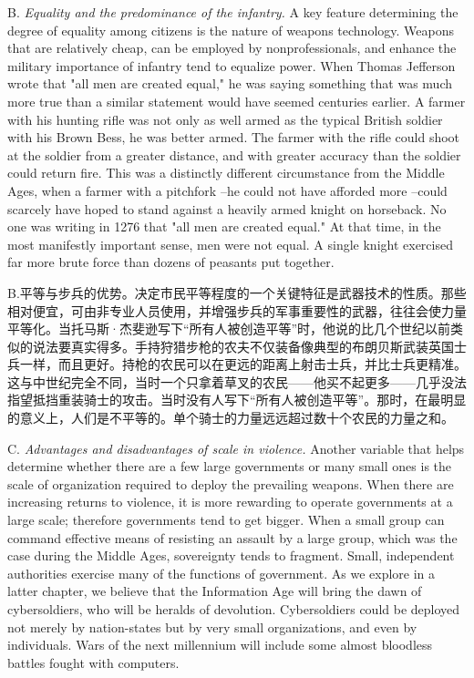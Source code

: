 \begin{Parallel}{97mm}{72mm}
  \ParallelLText
  {B. \emph{Equality and the predominance of the infantry.} A key feature determining the degree of equality among citizens is the nature of weapons technology. Weapons that are relatively cheap, can be employed by nonprofessionals, and enhance the military importance of infantry tend to equalize power. When Thomas Jefferson wrote that "all men are created equal," he was saying something that was much more true than a similar statement would have seemed centuries earlier. A farmer with his hunting rifle was not only as well armed as the typical British soldier with his Brown Bess, he was better armed. The farmer with the rifle could shoot at the soldier from a greater distance, and with greater accuracy than the soldier could return fire. This was a distinctly different circumstance from the Middle Ages, when a farmer with a pitchfork --he could not have afforded more --could scarcely have hoped to stand against a heavily armed knight on horseback. No one was writing in 1276 that "all men are created equal." At that time, in the most manifestly important sense, men were not equal. A single knight exercised far more brute force than dozens of peasants put together.}
  
  \ParallelRText
  {B.平等与步兵的优势。决定市民平等程度的一个关键特征是武器技术的性质。那些相对便宜，可由非专业人员使用，并增强步兵的军事重要性的武器，往往会使力量平等化。当托马斯·杰斐逊写下“所有人被创造平等”时，他说的比几个世纪以前类似的说法要真实得多。手持狩猎步枪的农夫不仅装备像典型的布朗贝斯武装英国士兵一样，而且更好。持枪的农民可以在更远的距离上射击士兵，并比士兵更精准。这与中世纪完全不同，当时一个只拿着草叉的农民——他买不起更多——几乎没法指望抵挡重装骑士的攻击。当时没有人写下“所有人被创造平等”。那时，在最明显的意义上，人们是不平等的。单个骑士的力量远远超过数十个农民的力量之和。}
  \ParallelPar


  \ParallelLText
  {C. \emph{Advantages and disadvantages of scale in violence.} Another variable that helps determine whether there are a few large governments or many small ones is the scale of organization required to deploy the prevailing weapons. When there are increasing returns to violence, it is more rewarding to operate governments at a large scale; therefore governments tend to get bigger. When a small group can command effective means of resisting an assault by a large group, which was the case during the Middle Ages, sovereignty tends to fragment. Small, independent authorities exercise many of the functions of government. As we explore in a latter chapter, we believe that the Information Age will bring the dawn of cybersoldiers, who will be heralds of devolution. Cybersoldiers could be deployed not merely by nation-states but by very small organizations, and even by individuals. Wars of the next millennium will include some almost bloodless battles fought with computers.    }
  

\end{Parallel}
